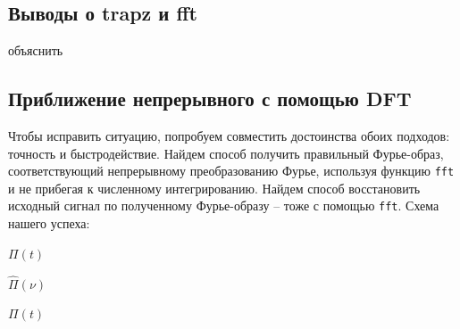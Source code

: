 \documentclass[a4paper, 12pt]{article}
\begin{document}
    \subsection{Выводы о trapz и fft}
    объяснить


    \subsection{Приближение непрерывного с помощью DFT}
    Чтобы исправить ситуацию, попробуем совместить достоинства обоих подходов: точность и быстродействие.
    Найдем способ получить правильный Фурье-образ, соответствующий непрерывному преобразованию Фурье, используя функцию \texttt{fft} и не прибегая к численному
    интегрированию. Найдем способ восстановить исходный сигнал по полученному
    Фурье-образу -- тоже с помощью \texttt{fft}. Схема нашего успеха:
    \begin{center}
        $\Pi(t)$
        $\hat{\Pi}(\nu)$
        $\Pi(t)$
    \end{center}
\end{document}
